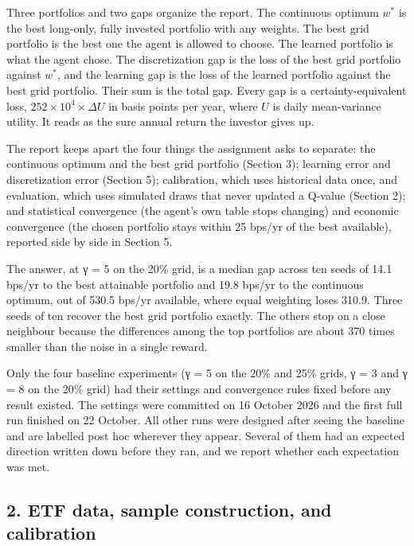 \documentclass[
  11pt]{article}
\begin{document}
Three portfolios and two gaps organize the report. The continuous
optimum \(w^*\) is the best long-only, fully invested portfolio with any
weights. The best grid portfolio is the best one the agent is allowed to
choose. The learned portfolio is what the agent chose. The
discretization gap is the loss of the best grid portfolio against
\(w^*\), and the learning gap is the loss of the learned portfolio
against the best grid portfolio. Their sum is the total gap. Every gap
is a certainty-equivalent loss, \(252 \times 10^4 \times \Delta U\) in
basis points per year, where \(U\) is daily mean-variance utility. It
reads as the sure annual return the investor gives up.

The report keeps apart the four things the assignment asks to separate:
the continuous optimum and the best grid portfolio (Section 3); learning
error and discretization error (Section 5); calibration, which uses
historical data once, and evaluation, which uses simulated draws that
never updated a Q-value (Section 2); and statistical convergence (the
agent's own table stops changing) and economic convergence (the chosen
portfolio stays within 25 bps/yr of the best available), reported side
by side in Section 5.

The answer, at γ = 5 on the 20\% grid, is a median gap across ten seeds
of 14.1 bps/yr to the best attainable portfolio and 19.8 bps/yr to the
continuous optimum, out of 530.5 bps/yr available, where equal weighting
loses 310.9. Three seeds of ten recover the best grid portfolio exactly.
The others stop on a close neighbour because the differences among the
top portfolios are about 370 times smaller than the noise in a single
reward.

Only the four baseline experiments (γ = 5 on the 20\% and 25\% grids, γ
= 3 and γ = 8 on the 20\% grid) had their settings and convergence rules
fixed before any result existed. The settings were committed on 16
October 2026 and the first full run finished on 22 October. All other
runs were designed after seeing the baseline and are labelled post hoc
wherever they appear. Several of them had an expected direction written
down before they ran, and we report whether each expectation was met.

\subsection{2. ETF data, sample construction, and
calibration}\label{etf-data-sample-construction-and-calibration}
\end{document}
